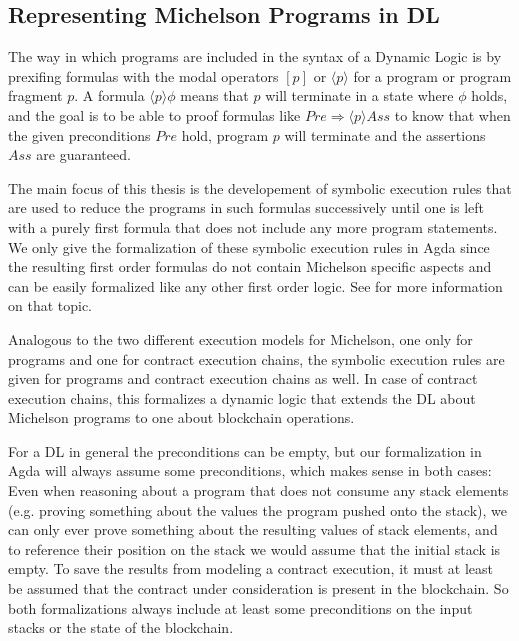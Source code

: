 \subsection{Representing Michelson Programs in DL}\label{sec:abstract-states}

The way in which programs are included in the syntax of a Dynamic Logic is
by prexifing formulas with the modal operators $[p]$ or $\langle p\rangle$
for a program or program fragment $p$.
A formula $\langle p\rangle \phi$ means that $p$ will terminate in a state where $\phi$ holds,
and the goal is to be able to proof formulas like
$Pre \Longrightarrow \langle p \rangle Ass$ to know that when the given preconditions $Pre$ hold,
program $p$ will terminate and the assertions $Ass$ are guaranteed.

The main focus of this thesis is the developement of symbolic execution rules that are used to
reduce the programs in such formulas successively until one is left
with a purely first formula that does not include any more program statements.
We only give the formalization of these symbolic execution rules in Agda
since the resulting first order formulas do not contain Michelson specific aspects
and can be easily formalized like any other first order logic.
See \cite{KeY2,DL} for more information on that topic.

Analogous to the two different execution models for Michelson,
one only for programs and one for contract execution chains,
the symbolic execution rules are given for programs and contract execution chains as well.
In case of contract execution chains, this formalizes a dynamic logic that extends the DL
about Michelson programs to one about blockchain operations.

For a DL in general the preconditions can be empty,
but our formalization in Agda will always assume some preconditions,
which makes sense in both cases:
Even when reasoning about a program that does not consume any stack elements
(e.g. proving something about the values the program pushed onto the stack),
we can only ever prove something about the resulting values of stack elements,
and to reference their position on the stack we would assume that the initial stack is empty.
To save the results from modeling a contract execution, it must at least be assumed
that the contract under consideration is present in the blockchain.
So both formalizations always include at least some preconditions on the input stacks
or the state of the blockchain.

